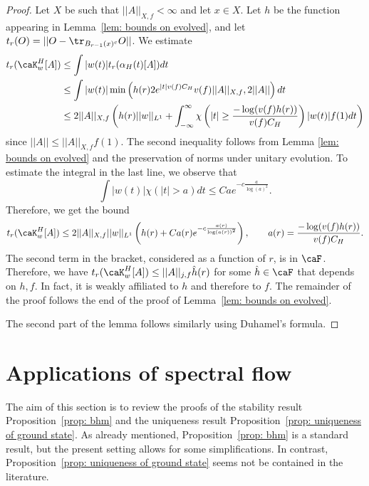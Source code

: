 \begin{proof}
	Let $X$ be such that $||A||_{X,f}<\infty$ and let $x\in X$. Let $h$ be the function appearing in Lemma~\ref{lem: bounds on evolved}, and let $t_r(O)=|| O-\tr_{B_{r-1}(x)^c} O || $. We estimate 
	\begin{align}
		t_r( \caK^{H}_w[A] )  &\leq   \int | w(t) | t_r(\alpha_H(t)[A]) dt  \\
		&\leq   \int | w(t) | \min\left( h(r) 2 e^{ | t | v(f) C_H}  v(f) ||A||_{X,f} , 2 ||A ||  \right) dt  \\
		&\leq  2 ||A||_{X,f}   \left(h(r)||w||_{L^1}  
		+ \int_{-\infty}^\infty \chi\left(|t|  \geq \frac{-\log (v(f) h(r))}{v(f) C_H}\right) | w(t) |f(1)  dt \right)
	\end{align}
	since $||A||\leq ||A||_{X,f}f(1)$. The second inequality follows from Lemma \ref{lem: bounds on evolved} and the preservation of norms under unitary evolution. 
	To estimate the integral in the last line, we observe that
	$$\int  | w(t) | \chi(|t|>a) dt \leq C a e^{-c\frac{a}{\log(a)^2}}. $$
	Therefore, we get the bound
	$$
	t_r( \caK^{H}_w[A] )  \leq  2 ||A||_{X,f} ||w||_{L^1}  \left(h(r)  + C a(r) e^{-c\frac{a(r)}{\log(a(r))^2}} \right),\qquad  a(r)= \frac{-\log (v(f) h(r))}{v(f) C_H}.
	$$
	The second term in the bracket, considered as a function of $r$, is in $\caF$.
	Therefore, we have  $t_r( \caK^{H}_w[A] ) \leq   ||A||_{j,f} \hat h(r)$ for some $\hat h\in\caF$ that depends on $h,f$. In fact, it is weakly affiliated to $h$ and therefore to $f$. The remainder of the proof follows the end of the proof of Lemma~\ref{lem: bounds on evolved}.
	
	The second part of the lemma follows similarly using Duhamel's formula.
\end{proof}



\section{Applications of spectral flow }   \label{sec: app stability}

The aim of this section is to review the proofs of the stability result Proposition~\ref{prop: bhm} and the uniqueness result Proposition~\ref{prop: uniqueness of ground state}. As already mentioned, Proposition~\ref{prop: bhm} is a standard result, but the present setting allows for some simplifications. In contrast, Proposition~\ref{prop: uniqueness of ground state} seems not be contained in the literature.

